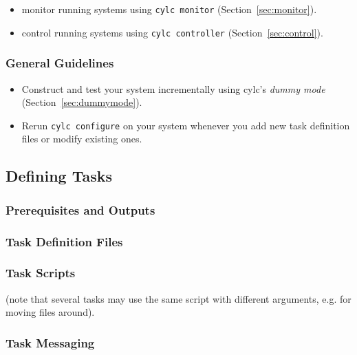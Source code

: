 \documentclass[11pt,a4paper]{article}
\begin{document}
\begin{itemize}
    \item monitor running systems using \verb=cylc monitor= (Section~\ref{sec:monitor}).

    \item control running systems using \verb=cylc controller= (Section~\ref{sec:control}).
\end{itemize}


\subsubsection{General Guidelines}

\begin{itemize}

    \item Construct and test your system incrementally using cylc's {\em
        dummy mode} (Section~\ref{sec:dummymode}).

    \item Rerun \verb=cylc configure= on your system whenever you add
        new task definition files or modify existing ones.
\end{itemize}

\label{sec:tasktype}
\subsection{Defining Tasks}

\label{sec:requisites}
\subsubsection{Prerequisites and Outputs}

\label{sec:taskdef}
\subsubsection{Task Definition Files}

\subsubsection{Task Scripts}

(note that several tasks may use the same script with different
arguments, e.g. for moving files around).

\subsubsection{Task Messaging}
\end{document}
